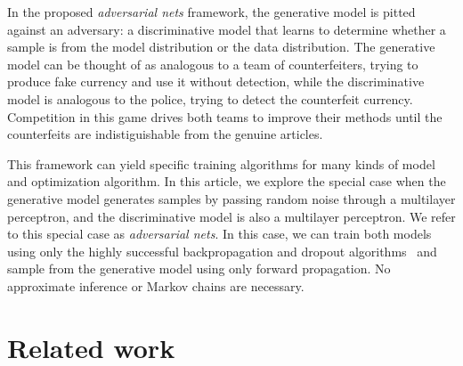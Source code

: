 \documentclass{article} %
\begin{document}
In the proposed {\em adversarial nets} framework, the generative model is pitted against an
adversary: a discriminative model that learns to determine whether a sample is
from the model distribution or the data distribution. The generative model can be thought of
as analogous to a team of counterfeiters, trying to produce fake currency and use it without
detection, while the discriminative model is analogous to the police, trying to detect the
counterfeit currency. Competition in this game drives both teams to improve their methods until the counterfeits
are indistiguishable from the genuine articles.

This framework can yield specific training algorithms for many kinds of model and optimization
algorithm. In this article, we explore the special case when the generative model generates
samples by passing random noise through a multilayer perceptron, and the discriminative model
is also a multilayer perceptron. We refer to this special case as {\em adversarial nets}.
In this case, we can train both models using only
the highly successful backpropagation and dropout algorithms~\citep{Hinton-et-al-arxiv2012} 
and sample from the generative
model using only forward propagation. No approximate inference or Markov chains are necessary.


\section{Related work}
\label{sec:related}

%

\end{document}

